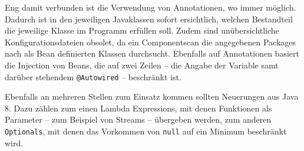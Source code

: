 Eng damit verbunden ist die Verwendung von Annotationen, wo immer möglich. Dadurch ist in den jeweiligen Javaklassen sofort ersichtlich, welchen Bestandteil die jeweilige Klasse im Programm erfüllen soll. Zudem sind unübersichtliche Konfigurationsdateien obsolet, da ein Componentscan die angegebenen Packages nach als Bean definierten Klassen durchsucht. Ebenfalls auf Annotationen basiert die Injection von Beans, die auf zwei Zeilen -- die Angabe der Variable samt darüber stehendem \texttt{@Autowired} -- beschränkt ist.

Ebenfalls an mehreren Stellen zum Einsatz kommen sollten Neuerungen aus Java 8. Dazu zählen zum einen Lambda Expressions, mit denen Funktionen als Parameter -- zum Beispiel von Streams -- übergeben werden, zum anderen \texttt{Optionals}, mit denen das Vorkommen von \texttt{null} auf ein Minimum beschränkt wird.